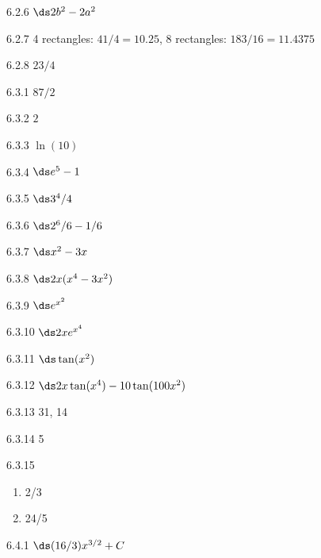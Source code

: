 \begin{Answer}{6.2.6}
 $\ds 2b^2-2a^2$
\end{Answer}
\begin{Answer}{6.2.7}
 4 rectangles: $41/4=10.25$,
8 rectangles: $183/16= 11.4375$
\end{Answer}
\begin{Answer}{6.2.8}
 $ 23/4$
\end{Answer}
\begin{Answer}{6.3.1}
 $87/2$
\end{Answer}
\begin{Answer}{6.3.2}
 $2$
\end{Answer}
\begin{Answer}{6.3.3}
 $\ln(10)$
\end{Answer}
\begin{Answer}{6.3.4}
 $\ds e^5-1$
\end{Answer}
\begin{Answer}{6.3.5}
 $\ds 3^4/4$
\end{Answer}
\begin{Answer}{6.3.6}
 $\ds 2^6/6 -1/6$
\end{Answer}
\begin{Answer}{6.3.7}
 $\ds x^2-3x$
\end{Answer}
\begin{Answer}{6.3.8}
 $\ds 2x(x^4-3x^2)$
\end{Answer}
\begin{Answer}{6.3.9}
 $\ds e^{x^2}$
\end{Answer}
\begin{Answer}{6.3.10}
 $\ds 2xe^{x^4}$
\end{Answer}
\begin{Answer}{6.3.11}
 $\ds \tan(x^2)$
\end{Answer}
\begin{Answer}{6.3.12}
 $\ds 2x\tan(x^4)-10\tan(100x^2)$
\end{Answer}
\begin{Answer}{6.3.13}
	31, 14
\end{Answer}
\begin{Answer}{6.3.14}
	5
\end{Answer}
\begin{Answer}{6.3.15}
\begin{enumerate}
	\item	2/3
	\item	24/5
\end{enumerate}
\end{Answer}
\begin{Answer}{6.4.1}
 $\ds (16/3)x^{3/2}+C$
\end{Answer}
